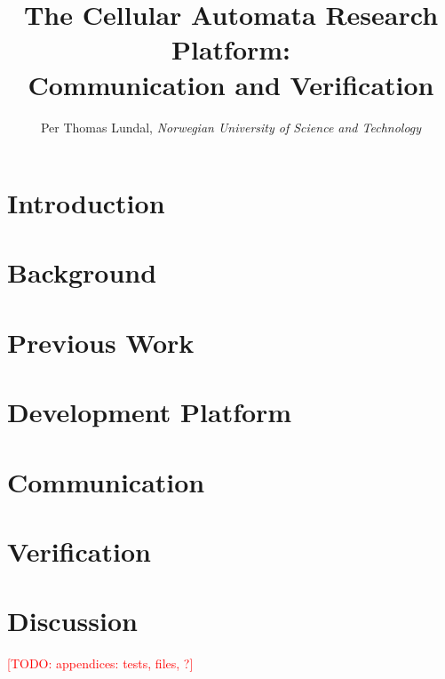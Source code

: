 \documentclass[a4paper]{IEEEtran}
\title{The Cellular Automata Research Platform: \\ Communication and Verification}
\author{Per Thomas Lundal, \emph{Norwegian University of Science and Technology}}
\newcommand\todo[1]{\textcolor{red}{[TODO: #1]}}
\begin{document}
\maketitle

\begin{abstract}

    

\end{abstract}

\section{Introduction}

    

\section{Background}

    

\section{Previous Work}

    

\section{Development Platform}

    

\section{Communication}

    

\section{Verification}

    

\section{Discussion}

    




\todo{appendices: tests, files, ?}
\end{document}
